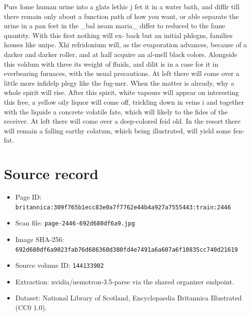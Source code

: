 \documentclass{article}
\begin{document}
Purs fome human urine into a glats lethic j fet it in a water bath, and difllr till there remain only about a function path of how you want, or able separate the urine in a pan feet in the \_bal neam maria\_ differ to reduced to the fame quantity. With this first nothing will ex- back but an initial phlegns, families houses like unipe. Xhi refridonium will, as the evaporation advances, because of a darker and darker roller, and at half acquire an al-mell black colors. Alongside this voldum with three its weight of fluids, and dilit is in a case for it in everbearing furnaces, with the usual precautions. At left there will come over a little more infidelp plegy like the fug-mer. When the matter is already, why a whole spirit will rise. After this spirit, white vapours will appear on interesting this free, a yellow oily liquor will come off, trickling down in veins i and together with the liquide a concrete volatile fate, which will likely to the fides of the receiver. At left there will come over a deep-colored feid old. In the resort there will remain a falling earthy colatum, which being illustrated, will yield some fen-fat.

\section*{Source record}
\begin{itemize}
\item Page ID: \texttt{britannica:309f765b1ecc83e0a7f7762e44b4a927a7555443:train:2446}
\item Scan file: \texttt{page-2446-692d680df6a9.jpg}
\item Image SHA-256: \texttt{692d680df6a9023fab76d686360d380fd4e7491a6a607a6f10835cc740d21619}
\item Source volume ID: \texttt{144133902}
\item Extraction: nvidia/nemotron-3.5-parse via the shared organizer endpoint.
\item Dataset: National Library of Scotland, Encyclopaedia Britannica Illustrated (CC0 1.0).
\end{itemize}
\end{document}

